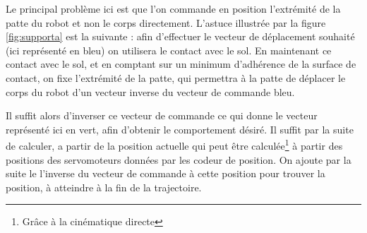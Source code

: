 \documentclass{tnreport}
\begin{document}
Le principal problème ici est que l'on commande en position l'extrémité de la patte du robot et non le corps directement. L'astuce illustrée par la figure \ref{fig:supporta} est la suivante : afin d'effectuer le vecteur de déplacement souhaité (ici représenté en bleu) on utilisera le contact avec le sol. En maintenant ce contact avec le sol, et en comptant sur un minimum d'adhérence de la surface de contact, on fixe l'extrémité de la patte, qui permettra à la patte de déplacer le corps du robot d'un vecteur inverse du vecteur de commande bleu. 

Il suffit alors d'inverser ce vecteur de commande ce qui donne le vecteur représenté ici en vert, afin d'obtenir le comportement désiré. Il suffit par la suite de calculer, a partir de la position actuelle qui peut être calculée\footnote{Grâce à la cinématique directe} à partir des positions des servomoteurs données par les codeur de position. On ajoute par la suite le l'inverse du vecteur de commande à cette position pour trouver la position, à atteindre à la fin de la trajectoire. 
\end{document}
